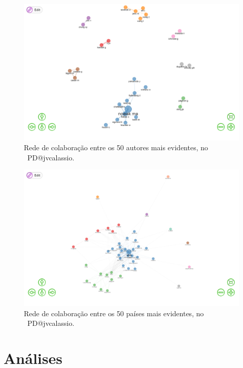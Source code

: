 \begin{figure}
    \centering
    \includegraphics[width=1\textwidth]{exploratory-data-analysis/jvcalassio/PesqBibliogr/PrisonersDilemma/WoS-20221201/Dataset/Collaboration-Network-Authors-2022-12-03.png}
    \caption{Rede de colaboração entre os 50 autores mais evidentes, no  \dataset\ PD@jvcalassio.}
    \label{fig:PD@jvcalassio:Collaboration-Network-50authors}
\end{figure}

\begin{figure}
    \centering
    \includegraphics[width=1\textwidth]{exploratory-data-analysis/jvcalassio/PesqBibliogr/PrisonersDilemma/WoS-20221201/Dataset/Collaboration-Network-Countries-2022-12-03.png}
    \caption{Rede de colaboração entre os 50 países mais evidentes, no  \dataset\ PD@jvcalassio.}
    \label{fig:PD@jvcalassio:Collaboration-Network-50country}
\end{figure}

\section{Análises\label{PD@jvcalassio:Analises}}


